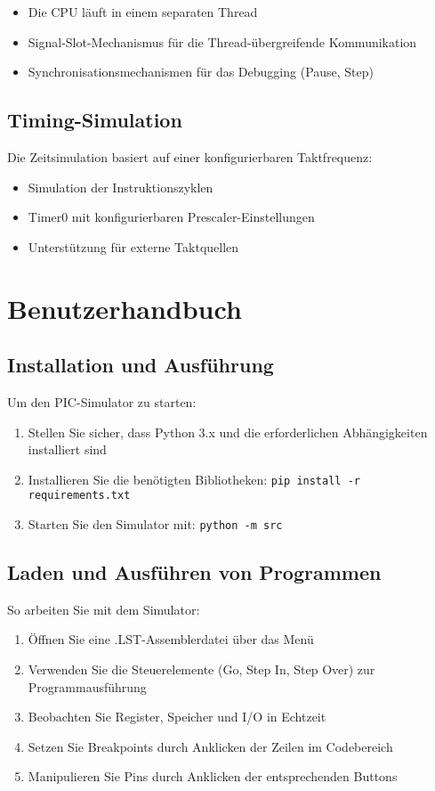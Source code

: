 \documentclass[a4paper,11pt]{report}
\begin{document}
\begin{itemize}
    \item Die CPU läuft in einem separaten Thread
    \item Signal-Slot-Mechanismus für die Thread-übergreifende Kommunikation
    \item Synchronisationsmechanismen für das Debugging (Pause, Step)
\end{itemize}

\section{Timing-Simulation}
Die Zeitsimulation basiert auf einer konfigurierbaren Taktfrequenz:

\begin{itemize}
    \item Simulation der Instruktionszyklen
    \item Timer0 mit konfigurierbaren Prescaler-Einstellungen
    \item Unterstützung für externe Taktquellen
\end{itemize}

\chapter{Benutzerhandbuch}

\section{Installation und Ausführung}
Um den PIC-Simulator zu starten:

\begin{enumerate}
    \item Stellen Sie sicher, dass Python 3.x und die erforderlichen Abhängigkeiten installiert sind
    \item Installieren Sie die benötigten Bibliotheken: \texttt{pip install -r requirements.txt}
    \item Starten Sie den Simulator mit: \texttt{python -m src}
\end{enumerate}

\section{Laden und Ausführen von Programmen}
So arbeiten Sie mit dem Simulator:

\begin{enumerate}
    \item Öffnen Sie eine .LST-Assemblerdatei über das Menü
    \item Verwenden Sie die Steuerelemente (Go, Step In, Step Over) zur Programmausführung
    \item Beobachten Sie Register, Speicher und I/O in Echtzeit
    \item Setzen Sie Breakpoints durch Anklicken der Zeilen im Codebereich
    \item Manipulieren Sie Pins durch Anklicken der entsprechenden Buttons
\end{enumerate}
\end{document}
